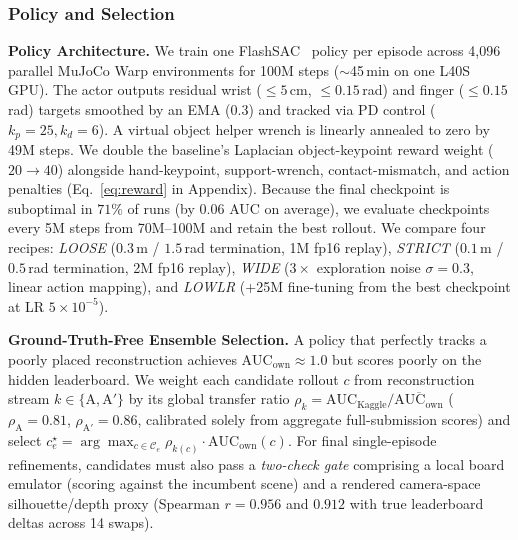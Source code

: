 \documentclass[10pt]{nvidiaextabstract}
\newcommand{\ownauc}{\ensuremath{\mathrm{AUC}_{\text{own}}}\xspace}
\begin{document}
\subsubsection{Policy and Selection}
\label{app:detail-policy}
\textbf{Policy Architecture.} We train one FlashSAC~\cite{flashchord,haarnoja2018sac} policy per episode across 4,096 parallel MuJoCo Warp environments for 100M steps ($\sim$45\,min on one L40S GPU). The actor outputs residual wrist ($\le 5$\,cm, $\le 0.15$\,rad) and finger ($\le 0.15$\,rad) targets smoothed by an EMA ($0.3$) and tracked via PD control ($k_p=25, k_d=6$). A virtual object helper wrench is linearly annealed to zero by 49M steps. We double the baseline's Laplacian object-keypoint reward weight ($20 \rightarrow 40$) alongside hand-keypoint, support-wrench, contact-mismatch, and action penalties (Eq.~\ref{eq:reward} in Appendix). Because the final checkpoint is suboptimal in $71\%$ of runs (by $0.06$ AUC on average), we evaluate checkpoints every 5M steps from 70M--100M and retain the best rollout. We compare four recipes: \emph{LOOSE} ($0.3$\,m / $1.5$\,rad termination, 1M fp16 replay), \emph{STRICT} ($0.1$\,m / $0.5$\,rad termination, 2M fp16 replay), \emph{WIDE} ($3\times$ exploration noise $\sigma=0.3$, linear action mapping), and \emph{LOWLR} (+25M fine-tuning from the best checkpoint at LR $5\times 10^{-5}$).

\textbf{Ground-Truth-Free Ensemble Selection.} A policy that perfectly tracks a poorly placed reconstruction achieves $\ownauc \approx 1.0$ but scores poorly on the hidden leaderboard. We weight each candidate rollout $c$ from reconstruction stream $k \in \{\text{A}, \text{A}'\}$ by its global transfer ratio $\rho_k = \mathrm{AUC}_{\text{Kaggle}} / \overline{\ownauc}$ ($\rho_{\text{A}} = 0.81$, $\rho_{\text{A}'} = 0.86$, calibrated solely from aggregate full-submission scores) and select $c^\star_e = \arg\max_{c \in \mathcal{C}_e} \rho_{k(c)} \cdot \ownauc(c)$. For final single-episode refinements, candidates must also pass a \emph{two-check gate} comprising a local board emulator (scoring against the incumbent scene) and a rendered camera-space silhouette/depth proxy (Spearman $r=0.956$ and $0.912$ with true leaderboard deltas across 14 swaps).
\end{document}
